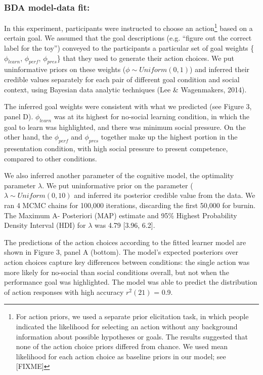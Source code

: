 \documentclass[10pt, letterpaper]{article}
\begin{document}
\subsubsection{BDA model-data fit:}\label{bda-model-data-fit}

In this experiment, participants were instructed to choose an
action\footnote{For action priors, we used a separate prior elicitation task, in which people indicated the likelihood for selecting an action without any background information about possible hypotheses or goals. The results suggested that none of the action choice priors differed from chance. We used mean likelihood for each action choice as baseline priors in our model; see [FIXME]}
based on a certain goal. We assumed that the goal descriptions (e.g.
``figure out the correct label for the toy'') conveyed to the
participants a particular set of goal weights \{\(\phi_{learn}\),
\(\phi_{perf}\), \(\phi_{pres}\)\} that they used to generate their
action choices. We put uninformative priors on these weights
(\(\phi \sim Uniform(0,1)\)) and inferred their credible values
separately for each pair of different goal condition and social context,
using Bayesian data analytic techniques (Lee \& Wagenmakers, 2014).

The inferred goal weights were consistent with what we predicted (see
Figure 3, panel D). \(\phi_{learn}\) was at its highest for no-social
learning condition, in which the goal to learn was highlighted, and
there was minimum social pressure. On the other hand, the
\(\phi_{perf}\) and \(\phi_{pres}\) together make up the highest portion
in the presentation condition, with high social pressure to present
competence, compared to other conditions.

We also inferred another parameter of the cognitive model, the
optimality parameter \(\lambda\). We put uninformative prior on the
parameter (\(\lambda \sim Uniform(0,10)\) and inferred its posterior
credible value from the data. We ran 4 MCMC chains for 100,000
iterations, discarding the first 50,000 for burnin. The Maximum A-
Posteriori (MAP) estimate and 95\% Highest Probability Density Interval
(HDI) for \(\lambda\) was 4.79 {[}3.96, 6.2{]}.

The predictions of the action choices according to the fitted learner
model are shown in Figure 3, panel A (bottom). The model's expected
posteriors over action choices capture key differences between
conditions: the single action was more likely for no-social than social
conditions overall, but not when the performance goal was highlighted.
The model was able to predict the distribution of action responses with
high accuracy \(r^2(21)\) = 0.9.
\end{document}
